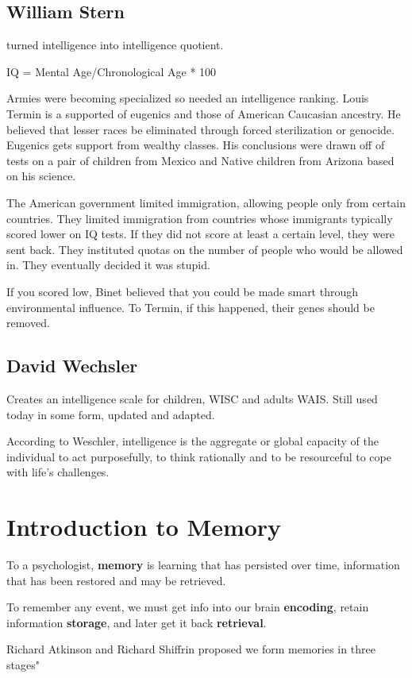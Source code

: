 \documentclass[12pt]{article}
\begin{document}
\subsection*{William Stern}
turned intelligence into intelligence quotient.

IQ = Mental Age/Chronological Age * 100

Armies were becoming specialized so needed an intelligence ranking. Louis Termin is a supported of eugenics and those of American Caucasian ancestry. He believed that lesser races be eliminated through forced sterilization or genocide. Eugenics gets support from wealthy classes. His conclusions were drawn off of tests on a pair of children from Mexico and Native children from Arizona based on his science.

The American government limited immigration, allowing people only from certain countries. They limited immigration from countries whose immigrants typically scored lower on IQ tests. If they did not score at least a certain level, they were sent back. They instituted quotas on the number of people who would be allowed in. They eventually decided it was stupid. 

If you scored low, Binet believed that you could be made smart through environmental influence. To Termin, if this happened, their genes should be removed. 

\subsection*{David Wechsler}
Creates an intelligence scale for children, WISC and adults WAIS. Still used today in some form, updated and adapted.

According to Weschler, intelligence is the aggregate or global capacity of the individual to act purposefully, to think rationally and to be resourceful to cope with life's challenges. 

\section*{Introduction to Memory}
To a psychologist, \textbf{memory} is learning that has persisted over time, information that has been restored and may be retrieved. 

To remember any event, we must get info into our brain \textbf{encoding}, retain information \textbf{storage}, and later get it back \textbf{retrieval}.

Richard Atkinson and Richard Shiffrin proposed we form memories in three stages"
\end{document}
